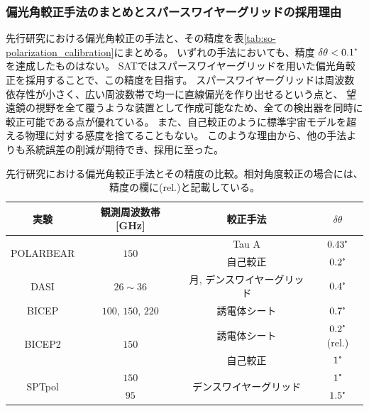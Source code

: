 \documentclass[../../main.tex]{subfiles}
\begin{document}
\subsubsection{偏光角較正手法のまとめとスパースワイヤーグリッドの採用理由}
先行研究における偏光角較正の手法と、その精度を表\ref{tab:so-polarization_calibration}にまとめる。
いずれの手法においても、精度 $\delta\theta < 0.1\tcdegree$ を達成したものはない。
SATではスパースワイヤーグリッドを用いた偏光角較正を採用することで、この精度を目指す。
スパースワイヤーグリッドは周波数依存性が小さく、広い周波数帯で均一に直線偏光を作り出せるという点と、
望遠鏡の視野を全て覆うような装置として作成可能なため、全ての検出器を同時に較正可能である点が優れている。
また、自己較正のように標準宇宙モデルを超える物理に対する感度を捨てることもない。
このような理由から、他の手法よりも系統誤差の削減が期待でき、採用に至った。
\begin{table}[H]
    \centering
    \caption[先行研究における偏光角較正手法とその精度の比較]{先行研究における偏光角較正手法とその精度の比較。相対角度較正の場合には、精度の欄に(rel.)と記載している。}
    \begin{tabular}{cccc}
        \hline
        実験 & 観測周波数帯 [GHz] & 較正手法 & $\delta\theta$ \\
        \hline
        \hline
        \multirow{2}{*}{POLARBEAR\cite{so:polarbear_cal}} & \multirow{2}{*}{$150$} & Tau A & $0.43\tcdegree$ \\
                                                          &                        & 自己較正 & $0.2\tcdegree$ \\
        \hline
        DASI\cite{so:Leitch_2002} & $26\sim36$ & 月, デンスワイヤーグリッド & $0.4\tcdegree$ \\
        \hline
        BICEP\cite{so:Takahashi_2008} & $100,\,150,\,220$ & 誘電体シート & $0.7\tcdegree$ \\
        \hline
        \multirow{2}{*}{BICEP2\cite{so:bicep2_syserr}} & \multirow{2}{*}{$150$} & 誘電体シート & $0.2\tcdegree$ (rel.) \\
                                                       & & 自己較正 & $1\tcdegree$\\
        \hline
        \multirow{2}{*}{SPTpol\cite{so:Hanson_2013}} & $150$ & \multirow{2}{*}{デンスワイヤーグリッド} & $1\tcdegree$ \\
                                                     & $95$  & & $1.5\tcdegree$ \\

\end{tabular}
\end{table}
\end{document}
